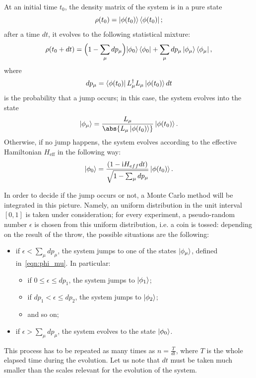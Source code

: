 At an initial time $t_0$, the density matrix of the system is in a pure state
\[
\rho(t_0) = \ket{\phi(t_0)}\bra{\phi(t_0)};
\]
after a time $dt$, it evolves to the following statistical mixture:
\begin{equation}
    \rho(t_0 + dt) = \Bigl(1-\sum_\mu dp_\mu \Bigl)\ket{\phi_0}\bra{\phi_0} + \sum_\mu dp_\mu \ket{\phi_\mu}\bra{\phi_\mu},
\end{equation}
where
\begin{equation}
    dp_\mu = \bra{\phi(t_0)}L_{\mu}^{\dagger}L_{\mu}\ket{\phi(t_0)}dt
\end{equation}
is the probability that a jump occurs; in this case, the system evolves into the state
\begin{equation}
\label{eqn:phi_mu}
    \ket{\phi_\mu} = \frac{L_\mu}{\abs{L_\mu\ket{\phi(t_0)}}}\ket{\phi(t_0)}.
\end{equation}
Otherwise, if no jump happens, the system evolves according to the effective Hamiltonian $H_\text{eff}$ in the following way:
\begin{equation}
    \ket{\phi_0} = \frac{(1-\textrm{i}H_{eff}dt)}{\sqrt{1-\sum_\mu dp_\mu}}\ket{\phi(t_0)}.
\end{equation}

In order to decide if the jump occurs or not, a Monte Carlo method will be integrated in this picture. Namely, an uniform distribution in the unit interval $[0,1]$ is taken under consideration; for every experiment, a pseudo-random number $\epsilon$ is chosen from this uniform distribution, i.e. a coin is tossed: depending on the result of the throw, the possible situations are the following:
\begin{itemize}
    \item if $\epsilon < \sum_\mu dp_\mu$, the system jumps to one of the states $\ket{\phi_\mu}$, defined in~\ref{eqn:phi_mu}. In particular:
    \begin{itemize}
        \item if $0 \leq \epsilon \leq dp_1$, the system jumps to $\ket{\phi_1}$;
        \item if $dp_1 < \epsilon \leq dp_2$, the system jumps to $\ket{\phi_2}$;
        \item and so on;
    \end{itemize}
    \item if $\epsilon > \sum_\mu dp_\mu$, the system evolves to the state $\ket{\phi_0}$.
\end{itemize}

This process has to be repeated as many times as $n = \frac{T}{dt}$, where $T$ is the whole elapsed time during the evolution. Let us note that $dt$ must be taken much smaller than the scales relevant for the evolution of the system.

